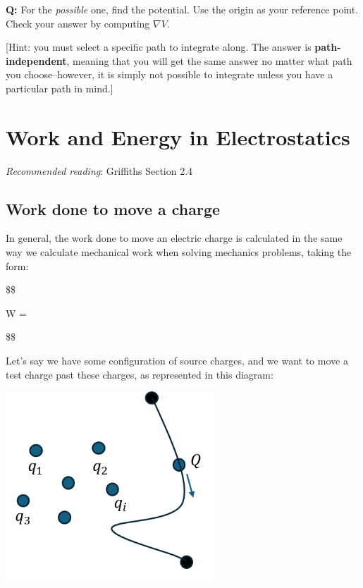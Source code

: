 \documentclass[
  letterpaper,
  DIV=11,
  numbers=noendperiod]{scrreprt}
\begin{document}
\textbf{Q:} For the \emph{possible} one, find the potential. Use the
origin as your reference point. Check your answer by computing
\(\nabla V\).

{[}Hint: you must select a specific path to integrate along. The answer
is \textbf{path-independent}, meaning that you will get the same answer
no matter what path you choose--however, it is simply not possible to
integrate unless you have a particular path in mind.{]}


\chapter{Work and Energy in
Electrostatics}\label{work-and-energy-in-electrostatics}

\newcommand{\l}{\mathrm{\mathbf{l}}}
\newcommand{\E}{\mathrm{\mathbf{E}}}
\newcommand{\F}{\mathrm{\mathbf{F}}}
\newcommand{\r}{\mathrm{\mathbf{r}}}

\newcommand{\x}{\mathrm{\mathbf{x}}}
\newcommand{\y}{\mathrm{\mathbf{y}}}
\newcommand{\z}{\mathrm{\mathbf{z}}}
\newcommand{\p}{\mathrm{\mathbf{p}}}
\newcommand{\d}{\mathrm{\mathbf{d}}}

\newcommand{\a}{\mathrm{\mathbf{a}}}
\newcommand{\b}{\mathrm{\mathbf{b}}}

\emph{Recommended reading}: Griffiths Section 2.4

\section{Work done to move a charge}\label{work-done-to-move-a-charge}

In general, the work done to move an electric charge is calculated in
the same way we calculate mechanical work when solving mechanics
problems, taking the form:

\$\$

W = \int {} \cdot {}  

\$\$

Let's say we have some configuration of source charges, and we want to
move a test charge past these charges, as represented in this diagram:

\includegraphics[width=3.125in,height=\textheight]{Figures/workdone_charge.png}
\end{document}
